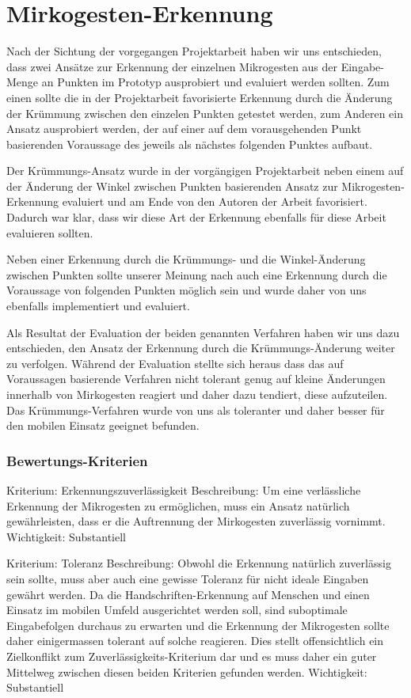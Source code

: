 \chapter{Mirkogesten-Erkennung}

Nach der Sichtung der vorgegangen Projektarbeit haben wir uns entschieden, dass zwei Ansätze zur Erkennung der einzelnen Mikrogesten aus der Eingabe-Menge an Punkten im Prototyp ausprobiert und evaluiert werden sollten. Zum einen sollte die in der Projektarbeit favorisierte Erkennung durch die Änderung der Krümmung zwischen den einzelen Punkten getestet werden, zum Anderen ein Ansatz ausprobiert werden, der auf einer auf dem vorausgehenden Punkt basierenden Voraussage des jeweils als nächstes folgenden Punktes aufbaut.

Der Krümmungs-Ansatz wurde in der vorgängigen Projektarbeit neben einem auf der Änderung der Winkel zwischen Punkten basierenden Ansatz zur Mikrogesten-Erkennung evaluiert und am Ende von den Autoren der Arbeit favorisiert. Dadurch war klar, dass wir diese Art der Erkennung ebenfalls für diese Arbeit evaluieren sollten.

Neben einer Erkennung durch die Krümmungs- und die Winkel-Änderung zwischen Punkten sollte unserer Meinung nach auch eine Erkennung durch die Voraussage von folgenden Punkten möglich sein und wurde daher von uns ebenfalls implementiert und evaluiert.

Als Resultat der Evaluation der beiden genannten Verfahren haben wir uns dazu entschieden, den Ansatz der Erkennung durch die Krümmungs-Änderung weiter zu verfolgen. Während der Evaluation stellte sich heraus dass das auf Voraussagen basierende Verfahren nicht tolerant genug auf kleine Änderungen innerhalb von Mirkogesten reagiert und daher dazu tendiert, diese aufzuteilen. Das Krümmungs-Verfahren wurde von uns als toleranter und daher besser für den mobilen Einsatz geeignet befunden.

\subsection{Bewertungs-Kriterien}

Kriterium:	Erkennungszuverlässigkeit
Beschreibung:	Um eine verlässliche Erkennung der Mikrogesten zu ermöglichen, muss ein Ansatz natürlich gewährleisten, dass er die Auftrennung der Mirkogesten zuverlässig vornimmt.
Wichtigkeit:	Substantiell

Kriterium:	Toleranz
Beschreibung:	Obwohl die Erkennung natürlich zuverlässig sein sollte, muss aber auch eine gewisse Toleranz für nicht ideale Eingaben gewährt werden. Da die Handschriften-Erkennung auf Menschen und einen Einsatz im mobilen Umfeld ausgerichtet werden soll, sind suboptimale Eingabefolgen durchaus zu erwarten und die Erkennung der Mikrogesten sollte daher einigermassen tolerant auf solche reagieren. Dies stellt offensichtlich ein Zielkonflikt zum Zuverlässigkeits-Kriterium dar und es muss daher ein guter Mittelweg zwischen diesen beiden Kriterien gefunden werden.
Wichtigkeit:	Substantiell

